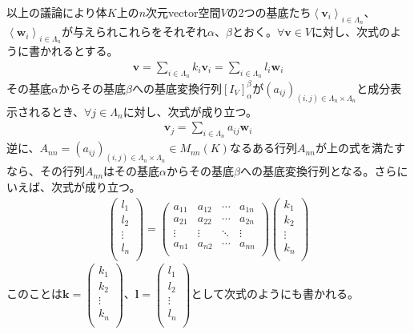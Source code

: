 \documentclass[dvipdfmx]{jsarticle}
\begin{document}
以上の議論により体$K$上の$n$次元vector空間$V$の2つの基底たち$\left\langle \mathbf{v}_{i} \right\rangle_{i \in \varLambda_{n}}$、$\left\langle \mathbf{w}_{i} \right\rangle_{i \in \varLambda_{n}}$が与えられこれらをそれぞれ$\alpha$、$\beta$とおく。$\forall\mathbf{v} \in V$に対し、次式のように書かれるとする。
\begin{align*}
\mathbf{v} = \sum_{i \in \varLambda_{n}} {k_{i}\mathbf{v}_{i}} = \sum_{i \in \varLambda_{n}} {l_{i}\mathbf{w}_{i}}
\end{align*}
その基底$\alpha$からその基底$\beta$への基底変換行列$\left[ I_{V} \right]^{\beta}_{\alpha}$が$\left( a_{ij} \right)_{(i,j) \in \varLambda_{n} \times \varLambda_{n}}$と成分表示されるとき、$\forall j \in \varLambda_{n}$に対し、次式が成り立つ。
\begin{align*}
\mathbf{v}_{j} = \sum_{i \in \varLambda_{n}} {a_{ij}\mathbf{w}_{i}}
\end{align*}
逆に、$A_{nn} = \left( a_{ij} \right)_{(i,j) \in \varLambda_{n} \times \varLambda_{n}} \in M_{nn}(K)$なるある行列$A_{nn}$が上の式を満たすなら、その行列$A_{nn}$はその基底$\alpha$からその基底$\beta$への基底変換行列となる。さらにいえば、次式が成り立つ。
\begin{align*}
\begin{pmatrix}
l_{1} \\
l_{2} \\
 \vdots \\
l_{n} \\
\end{pmatrix} = \begin{pmatrix}
a_{11} & a_{12} & \cdots & a_{1n} \\
a_{21} & a_{22} & \cdots & a_{2n} \\
 \vdots & \vdots & \ddots & \vdots \\
a_{n1} & a_{n2} & \cdots & a_{nn} \\
\end{pmatrix}\begin{pmatrix}
k_{1} \\
k_{2} \\
 \vdots \\
k_{n} \\
\end{pmatrix}
\end{align*}
このことは$\mathbf{k} = \begin{pmatrix}
k_{1} \\
k_{2} \\
 \vdots \\
k_{n} \\
\end{pmatrix}$、$\mathbf{l} = \begin{pmatrix}
l_{1} \\
l_{2} \\
 \vdots \\
l_{n} \\
\end{pmatrix}$として次式のようにも書かれる。
\end{document}

